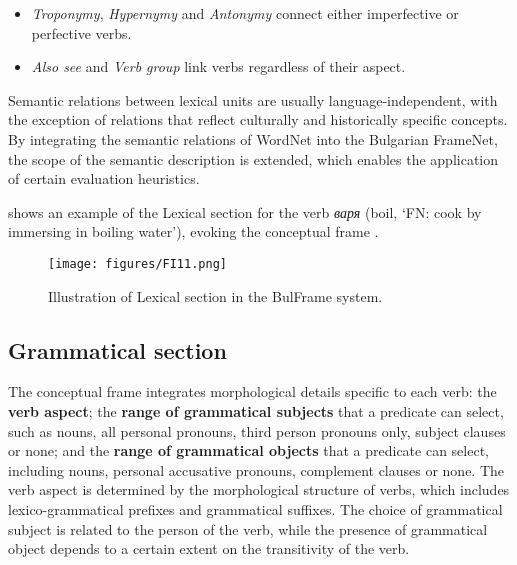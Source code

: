 \documentclass[output=paper,colorlinks,citecolor=brown]{langscibook}
\begin{document}
\begin{itemize}
 \item \emph{Troponymy}, \emph{Hypernymy} and \emph{Antonymy} connect either imperfective or perfective verbs.
 \item \emph{Also see} and \emph{Verb group} link verbs regardless of their  aspect.
\end{itemize}

Semantic relations between lexical units are usually language-independent, with the exception of relations that reflect culturally and historically specific concepts. By integrating the semantic relations of WordNet into the Bulgarian FrameNet, the scope of the semantic description is extended, which enables the application of certain evaluation heuristics.

 shows an example of the Lexical section for the verb \textit{варя} (boil, `FN: cook by immersing in boiling water'), evoking the  conceptual frame .

\begin{figure}[ht]
  \texttt{[image: figures/FI11.png]}
  \caption{Illustration of Lexical section in the BulFrame system.}
  \label{fig:F11.png}
\end{figure}

\subsection{Grammatical section}

The conceptual frame integrates morphological details specific to each verb: the \textbf{verb aspect}; the \textbf{range of grammatical subjects} that a predicate can select, such as nouns, all personal pronouns, third person pronouns only, subject clauses or none; and the \textbf{range of grammatical objects} that a predicate can select, including nouns, personal accusative pronouns, complement clauses or none. The verb aspect is determined by the morphological structure of verbs, which includes lexico-grammatical prefixes and grammatical suffixes.
The choice of grammatical subject is related to the person of the verb, while the presence of grammatical object depends to a certain extent on the transitivity of the verb.
\end{document}
